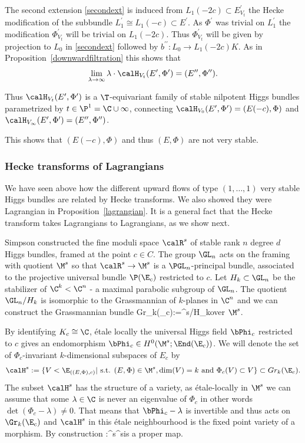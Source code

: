 The second extension \eqref{secondext} is induced from $L_1(-2c)\subset E^\prime_{V_t}$ the Hecke modification of the subbundle $L_1^\prime\cong L_1(-c)\subset E^\prime$. As $\Phi^\prime$ was trivial on $L_1^\prime$ the modification $\Phi^\prime_{V_t}$ will be trivial on $L_1(-2c)$. Thus $\Phi^\prime_{V_t}$ will be given by projection to $L_0$ in \eqref{secondext} followed by $b^{\prime\prime}:L_0\to L_1(-2c)K$. As in Proposition~\ref{downwardfiltration} this shows that $$\lim_{\lambda\to \infty} \lambda\cdot \calH_{V_t}(E^\prime,\Phi^\prime) =(E^{\prime\prime},\Phi^{\prime\prime}). $$

Thus $\calH_{V_t}(E^\prime,\Phi^\prime)$ is a $
\T$-equivariant family of stable nilpotent Higgs bundles parametrized by $t\in \P^1=\C\cup \infty$, connecting $\calH_{V_0}(E^\prime,\Phi^\prime)=(E(-c),\Phi)$ and $\calH_{V_\infty}(E^\prime,\Phi^\prime)=(E^{\prime\prime},\Phi^{\prime\prime})$.

This shows that $(E(-c),\Phi)$ and thus $(E,\Phi)$ are not very stable.

\subsubsection{Hecke transforms of Lagrangians}
We have seen above how the different  upward flows of  type $(1,\dots,1)$ very stable Higgs bundles are related by Hecke transforms. We also showed they were Lagrangian in Proposition~\ref{lagrangian}. It is a general fact that the Hecke transform takes Lagrangians to Lagrangians, as we show next.

Simpson constructed \cite[Theorem 4.10]{simpson1} the fine moduli space $\calR^s$ of  stable rank $n$ degree $d$ Higgs bundles, framed at the point $c\in C$. The group $\GL_n$ acts on the framing with quotient  $\M^s$ so that $\calR^s\to \M^s$ is a $\PGL_n$-principal bundle, associated to the projective universal bundle $\P(\E_c)$ restricted to $c$. Let $H_k\subset \GL_n$ be the stabilizer of $\C^k<\C^n$ - a maximal parabolic subgroup of $\GL_n$. The quotient  $\GL_n/H_k$ is isomorphic to the Grassmannian of $k$-planes in $\C^n$ and we can construct the Grassmannian bundle \beq \label{grassmann} Gr_k(\E_c):=\calR^s/H_k\eeq over $\M^s$.

By identifying $K_c\cong \C$, \'etale locally the universal Higgs field $\bPhi_c$ restricted to $c$ gives an endomorphism $\bPhi_c\in H^0(\M^s;\End(\E_c))$. We will denote the set of $\Phi_c$-invariant $k$-dimensional subspaces of $E_c$ by $$\calH^s:=\{V< \E_{((E,\Phi),c)} | \mbox{ s.t. }
(E,\Phi)\in \M^s, \dim(V)=k \mbox{ and } \Phi_c(V)\subset V \}\subset Gr_k(\E_c).$$ The subset $\calH^s$ has the structure of a variety, as \'etale-locally in $\M^s$ we can assume that  some $\lambda\in\C$ is never an eigenvalue of $\Phi_c$ in other words $\det(\Phi_c-\lambda)\neq 0$. That means that $\bPhi_c-\lambda$ is invertible and thus acts on $\Gr_k(\E_c)$ and  $\calH^s$ in this \'etale neighbourhood is the fixed point variety of a morphism. By construction \beq\label{proper}\pi:\calH^s\to \M^s\eeq is a proper map.

